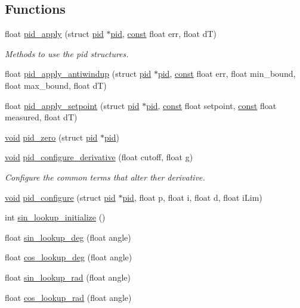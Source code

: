 \subsection*{Functions}
\begin{DoxyCompactItemize}
\item 
float \hyperlink{group___sine_gad03a357c11d4b4f48d0b53508c134172}{pid\-\_\-apply} (struct \hyperlink{structpid}{pid} $\ast$\hyperlink{structpid}{pid}, \hyperlink{group___n_a_m_e_ga7ae6d0e43244213b34de2c2b9aa30da6}{const} float err, float d\-T)
\begin{DoxyCompactList}\small\item\em Methods to use the pid structures. \end{DoxyCompactList}\item 
float \hyperlink{group___sine_gaf54d5f129b61126e45090a00f76a5e5f}{pid\-\_\-apply\-\_\-antiwindup} (struct \hyperlink{structpid}{pid} $\ast$\hyperlink{structpid}{pid}, \hyperlink{group___n_a_m_e_ga7ae6d0e43244213b34de2c2b9aa30da6}{const} float err, float min\-\_\-bound, float max\-\_\-bound, float d\-T)
\item 
float \hyperlink{group___sine_ga45b7c7ad39b81a853b97decfeed5e7c1}{pid\-\_\-apply\-\_\-setpoint} (struct \hyperlink{structpid}{pid} $\ast$\hyperlink{structpid}{pid}, \hyperlink{group___n_a_m_e_ga7ae6d0e43244213b34de2c2b9aa30da6}{const} float setpoint, \hyperlink{group___n_a_m_e_ga7ae6d0e43244213b34de2c2b9aa30da6}{const} float measured, float d\-T)
\item 
\hyperlink{group___n_a_m_e_ga18028b8badbf1ea7e704ccac3c488e82}{void} \hyperlink{group___sine_ga2e2dbc48e2b186b32beebd99e18f79e9}{pid\-\_\-zero} (struct \hyperlink{structpid}{pid} $\ast$\hyperlink{structpid}{pid})
\item 
\hyperlink{group___n_a_m_e_ga18028b8badbf1ea7e704ccac3c488e82}{void} \hyperlink{group___sine_ga90a5d55ff766104f2cf9b4f2cc28d60f}{pid\-\_\-configure\-\_\-derivative} (float cutoff, float g)
\begin{DoxyCompactList}\small\item\em Configure the common terms that alter ther derivative. \end{DoxyCompactList}\item 
\hyperlink{group___n_a_m_e_ga18028b8badbf1ea7e704ccac3c488e82}{void} \hyperlink{group___sine_ga01f26a319e659b2b74a32a52a4a88f95}{pid\-\_\-configure} (struct \hyperlink{structpid}{pid} $\ast$\hyperlink{structpid}{pid}, float p, float i, float d, float i\-Lim)
\item 
int \hyperlink{group___sine_gab64609ff84fffb0c000fc2662bd366c8}{sin\-\_\-lookup\-\_\-initialize} ()
\item 
float \hyperlink{group___sine_ga13ede2c56ef26af3ff520fecfe431e93}{sin\-\_\-lookup\-\_\-deg} (float angle)
\item 
float \hyperlink{group___sine_ga0a33b0bed5253ba4fe99f9e473d2fd53}{cos\-\_\-lookup\-\_\-deg} (float angle)
\item 
float \hyperlink{group___sine_gab8fd4ab7486a98f459a2d33ef3f31e9e}{sin\-\_\-lookup\-\_\-rad} (float angle)
\item 
float \hyperlink{group___sine_ga91a19e3f141f282bbdb792b2d4a69181}{cos\-\_\-lookup\-\_\-rad} (float angle)
\end{DoxyCompactItemize}

